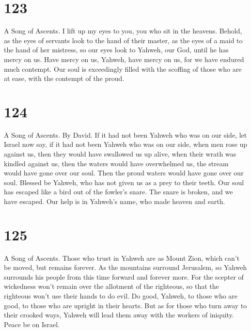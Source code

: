 \hypertarget{section-115}{%
\section{123}\label{section-115}}

A Song of Ascents.  I lift up my eyes to you, you who sit
in the heavens.  Behold, as the eyes of servants look to
the hand of their master, as the eyes of a maid to the hand of her
mistress, so our eyes look to Yahweh, our God, until he has mercy on us.
 Have mercy on us, Yahweh, have mercy on us, for we have
endured much contempt.  Our soul is exceedingly filled
with the scoffing of those who are at ease, with the contempt of the
proud.

\hypertarget{section-116}{%
\section{124}\label{section-116}}

A Song of Ascents. By David.  If it had not been Yahweh
who was on our side, let Israel now say,  if it had not
been Yahweh who was on our side, when men rose up against us,
 then they would have swallowed us up alive, when their
wrath was kindled against us,  then the waters would have
overwhelmed us, the stream would have gone over our soul. 
Then the proud waters would have gone over our soul. 
Blessed be Yahweh, who has not given us as a prey to their teeth.
 Our soul has escaped like a bird out of the fowler's
snare. The snare is broken, and we have escaped.  Our help
is in Yahweh's name, who made heaven and earth.

\hypertarget{section-117}{%
\section{125}\label{section-117}}

A Song of Ascents.  Those who trust in Yahweh are as Mount
Zion, which can't be moved, but remains forever.  As the
mountains surround Jerusalem, so Yahweh surrounds his people from this
time forward and forever more.  For the scepter of
wickedness won't remain over the allotment of the righteous, so that the
righteous won't use their hands to do evil.  Do good,
Yahweh, to those who are good, to those who are upright in their hearts.
 But as for those who turn away to their crooked ways,
Yahweh will lead them away with the workers of iniquity. Peace be on
Israel.

